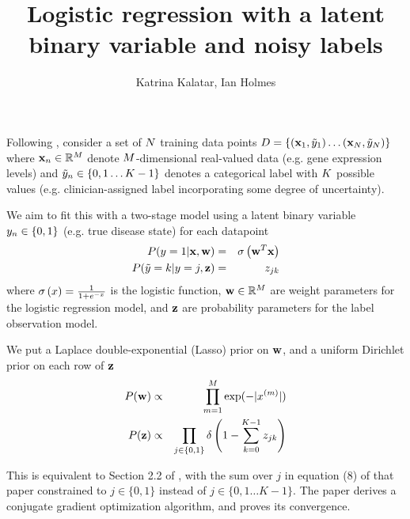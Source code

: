 \documentclass{article}
\begin{document}

\title{Logistic regression with a latent binary variable and noisy labels}
\author{Katrina Kalatar, Ian Holmes}

\maketitle

Following \cite{BootkrajangKaban2012},
consider a set of $N$ training data points
$D = \left\{ ({\bf x}_1,\tilde{y}_1) \ldots ({\bf x}_N,\tilde{y}_N) \right\}$
where
${\bf x}_n \in \mathbb{R}^M$
denote $M$-dimensional real-valued data (e.g. gene expression levels)
and
$\tilde{y}_n \in \left\{ 0, 1 \ldots K - 1 \right\}$
denotes a categorical label with $K$ possible values
(e.g. clinician-assigned label incorporating some degree of uncertainty).

We aim to fit this with a two-stage model using a latent binary variable
$y_n \in \left\{ 0, 1 \right\}$
(e.g. true disease state) for each datapoint
\begin{eqnarray*}
P(y = 1 | {\bf x}, {\bf w}) & = & \sigma\left({\bf w}^T {\bf x}\right) \\
P(\tilde{y} = k | y = j, {\bf z}) & = & z_{jk}
\end{eqnarray*}
where
$\sigma\left(x\right) = \frac{1}{1+e^{-x}}$ is the logistic function,
${\bf w} \in \mathbb{R}^M$ are weight parameters for the logistic regression model, and
${\bf z}$ are probability parameters for the label observation model.

We put a Laplace double-exponential (Lasso) prior on ${\bf w}$, and a uniform Dirichlet prior on each row of ${\bf z}$
\begin{eqnarray*}
P({\bf w}) & \propto & \prod_{m=1}^{M} \exp(-|x^{(m)}|) \\
P({\bf z}) & \propto & \prod_{j \in \{0,1\}} \delta \left( 1 - \sum_{k=0}^{K-1} z_{jk} \right)
\end{eqnarray*}

This is equivalent to Section 2.2 of \cite{BootkrajangKaban2012},
with the sum over $j$ in equation (8) of that paper constrained to $j\in\{0,1\}$
instead of $j\in\{0,1\ldots K-1\}$.
The paper derives a conjugate gradient optimization algorithm,
and proves its convergence.




\end{document}
